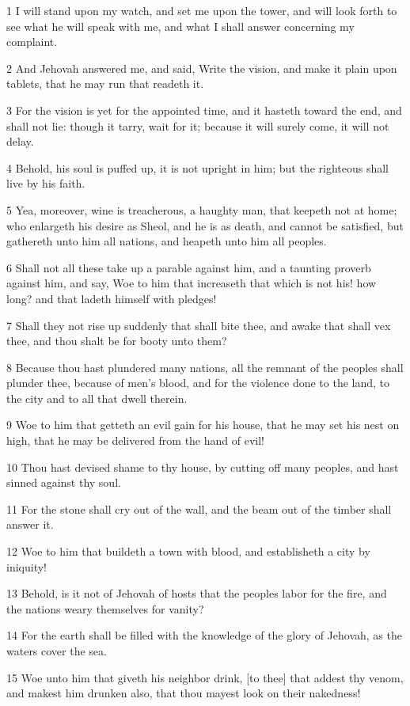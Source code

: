 \par 1 I will stand upon my watch, and set me upon the tower, and will look forth to see what he will speak with me, and what I shall answer concerning my complaint.
\par 2 And Jehovah answered me, and said, Write the vision, and make it plain upon tablets, that he may run that readeth it.
\par 3 For the vision is yet for the appointed time, and it hasteth toward the end, and shall not lie: though it tarry, wait for it; because it will surely come, it will not delay.
\par 4 Behold, his soul is puffed up, it is not upright in him; but the righteous shall live by his faith.
\par 5 Yea, moreover, wine is treacherous, a haughty man, that keepeth not at home; who enlargeth his desire as Sheol, and he is as death, and cannot be satisfied, but gathereth unto him all nations, and heapeth unto him all peoples.
\par 6 Shall not all these take up a parable against him, and a taunting proverb against him, and say, Woe to him that increaseth that which is not his! how long? and that ladeth himself with pledges!
\par 7 Shall they not rise up suddenly that shall bite thee, and awake that shall vex thee, and thou shalt be for booty unto them?
\par 8 Because thou hast plundered many nations, all the remnant of the peoples shall plunder thee, because of men's blood, and for the violence done to the land, to the city and to all that dwell therein.
\par 9 Woe to him that getteth an evil gain for his house, that he may set his nest on high, that he may be delivered from the hand of evil!
\par 10 Thou hast devised shame to thy house, by cutting off many peoples, and hast sinned against thy soul.
\par 11 For the stone shall cry out of the wall, and the beam out of the timber shall answer it.
\par 12 Woe to him that buildeth a town with blood, and establisheth a city by iniquity!
\par 13 Behold, is it not of Jehovah of hosts that the peoples labor for the fire, and the nations weary themselves for vanity?
\par 14 For the earth shall be filled with the knowledge of the glory of Jehovah, as the waters cover the sea.
\par 15 Woe unto him that giveth his neighbor drink, [to thee] that addest thy venom, and makest him drunken also, that thou mayest look on their nakedness!
